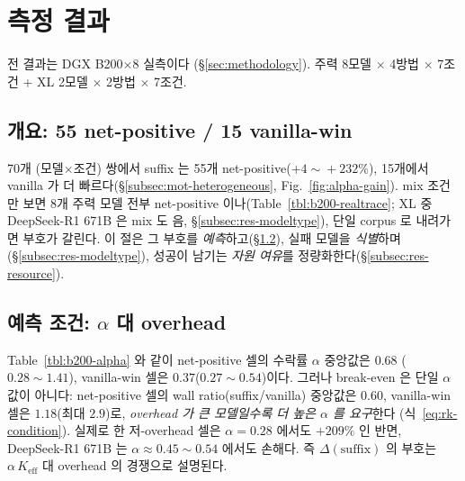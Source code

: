 
\section{측정 결과}
\label{sec:results}

전 결과는 DGX B200$\times$8 실측이다 (\S\ref{sec:methodology}).
주력 8모델 $\times$ 4방법 $\times$ 7조건 + XL 2모델 $\times$ 2방법 $\times$ 7조건.

\subsection{개요: 55 net-positive / 15 vanilla-win}
\label{subsec:res-overview}

70개 (모델$\times$조건) 쌍에서 suffix 는 55개 net-positive($+4\!\sim\!+232\%$),
15개에서 vanilla 가 더 빠르다(\S\ref{subsec:mot-heterogeneous}, Fig.~\ref{fig:alpha-gain}).
mix 조건만 보면 8개 주력 모델 전부 net-positive 이나(Table~\ref{tbl:b200-realtrace};
XL 중 DeepSeek-R1 671B 은 mix 도 음, \S\ref{subsec:res-modeltype}),
단일 corpus 로 내려가면 부호가 갈린다.
이 절은 그 부호를 \emph{예측}하고(\S\ref{subsec:res-alpha}),
실패 모델을 \emph{식별}하며(\S\ref{subsec:res-modeltype}),
성공이 남기는 \emph{자원 여유}를 정량화한다(\S\ref{subsec:res-resource}).

\subsection{예측 조건: $\alpha$ 대 overhead}
\label{subsec:res-alpha}



Table~\ref{tbl:b200-alpha} 와 같이 net-positive 셀의 수락률 $\alpha$ 중앙값은 $0.68$
($0.28\!\sim\!1.41$), vanilla-win 셀은 $0.37$($0.27\!\sim\!0.54$)이다.
그러나 break-even 은 단일 $\alpha$ 값이 아니다:
net-positive 셀의 wall ratio(suffix/vanilla) 중앙값은 $0.60$,
vanilla-win 셀은 $1.18$(최대 $2.9$)로, \emph{overhead 가 큰 모델일수록 더 높은 $\alpha$ 를 요구}한다
(식~\ref{eq:rk-condition}).
실제로 한 저-overhead 셀은 $\alpha\!=\!0.28$ 에서도 $+209\%$ 인 반면,
DeepSeek-R1 671B 는 $\alpha\!\approx\!0.45\!\sim\!0.54$ 에서도 손해다.
즉 $\Delta(\mathrm{suffix})$ 의 부호는 $\alpha\,K_{\mathrm{eff}}$ 대 overhead 의 경쟁으로 설명된다.

